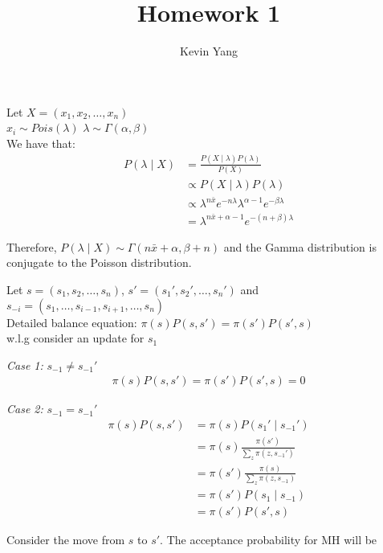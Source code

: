 \documentclass[10pt]{homeworg}
\title{Homework 1}
\author{Kevin Yang}
\begin{document}
\maketitle

\exercise
Let $X = (x_1, x_2, \ldots, x_n)$ \\
\vspace{0.5cm}
$x_i \sim Pois(\lambda)$  \hspace{2cm} $\lambda \sim \Gamma(\alpha, \beta)$
\\
We have that:
\begin{align*}
P(\lambda \mid X) &= \frac{P(X \mid \lambda)P(\lambda)}{P(X)}\\
				  &\propto P(X \mid \lambda)P(\lambda)\\
				  &\propto \lambda^{n\bar{x}}e^{-n\lambda}\lambda^{\alpha-1}e^{-\beta\lambda}\\
				  &= \lambda^{n\bar{x}+\alpha-1}e^{-(n+\beta)\lambda}
\end{align*}

Therefore, $P(\lambda \mid X) \sim \Gamma(n\bar{x}+\alpha, \beta+n)$ and the Gamma distribution is conjugate to the Poisson distribution.

\exercise
Let $s = (s_1, s_2, \ldots, s_n)$, $s' = (s_1', s_2', \ldots, s_n')$ and $s_{-i} = (s_1, \ldots, s_{i-1}, s_{i+1}, \ldots, s_n)$\\
Detailed balance equation: $\pi(s)P(s,s')=\pi(s')P(s',s)$\\

w.l.g consider an update for $s_1$\\
\vspace{0.5cm}

\textit{Case 1:} $s_{-1} \neq s_{-1}'$
\begin{align*}
\pi(s)P(s,s') = \pi(s')P(s',s) = 0
\end{align*}


\textit{Case 2:} $s_{-1} = s_{-1}'$
\begin{align*}
\pi(s)P(s,s') &= \pi(s)P(s_1' \mid s_{-1}')\\
			  &= \pi(s)\frac{\pi(s')}{\sum_z \pi(z, s_{-1}')}\\
			  &= \pi(s')\frac{\pi(s)}{\sum_z \pi(z, s_{-1})}\\
			  &= \pi(s')P(s_1 \mid s_{-1})\\
			  &= \pi(s')P(s',s)
\end{align*}

Consider the move from $s$ to $s'$. The acceptance probability for MH will be
\end{document}
